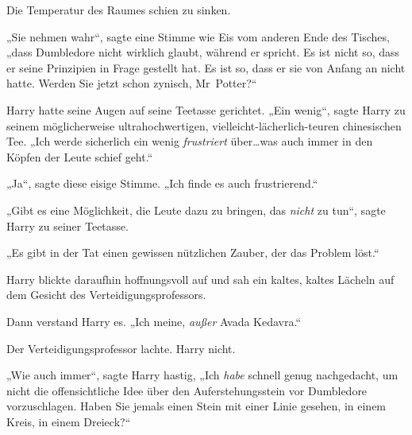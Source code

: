 Die Temperatur des Raumes schien zu sinken.

„Sie nehmen wahr“, sagte eine Stimme wie Eis vom anderen Ende des Tisches, „dass Dumbledore nicht wirklich glaubt, während er spricht. Es ist nicht so, dass er seine Prinzipien in Frage gestellt hat. Es ist so, dass er sie von Anfang an nicht hatte. Werden Sie jetzt schon zynisch, Mr~Potter?“

Harry hatte seine Augen auf seine Teetasse gerichtet.
„Ein wenig“, sagte Harry zu seinem möglicherweise ultrahochwertigen, vielleicht-lächerlich-teuren chinesischen Tee.
„Ich werde sicherlich ein wenig \emph{frustriert} über…was auch immer in den Köpfen der Leute schief geht.“

„Ja“, sagte diese eisige Stimme.
„Ich finde es auch frustrierend.“

„Gibt es eine Möglichkeit, die Leute dazu zu bringen, das \emph{nicht} zu tun“, sagte Harry zu seiner Teetasse.

„Es gibt in der Tat einen gewissen nützlichen Zauber, der das Problem löst.“

Harry blickte daraufhin hoffnungsvoll auf und sah ein kaltes, kaltes Lächeln auf dem Gesicht des Verteidigungsprofessors.

Dann verstand Harry es.
„Ich meine, \emph{außer} Avada Kedavra.“

Der Verteidigungsprofessor lachte. Harry nicht.

„Wie auch immer“, sagte Harry hastig,
„Ich \emph{habe} schnell genug nachgedacht, um nicht die offensichtliche Idee über den Auferstehungsstein vor Dumbledore vorzuschlagen. Haben Sie jemals einen Stein mit einer Linie gesehen, in einem Kreis, in einem Dreieck?“

